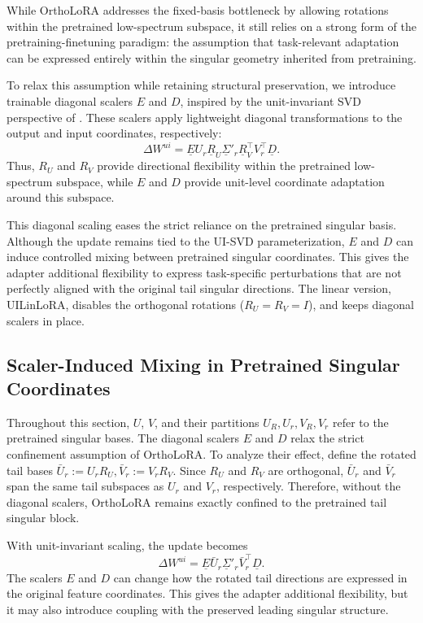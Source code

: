 \documentclass{article}
\begin{document}
While OrthoLoRA addresses the fixed-basis bottleneck by allowing rotations within
the pretrained low-spectrum subspace, it still relies on a strong form of the
pretraining-finetuning paradigm: the assumption that task-relevant adaptation
can be expressed entirely within the singular geometry inherited from
pretraining.

To relax this assumption while retaining structural preservation, we introduce
trainable diagonal scalers $E$ and $D$, inspired by the unit-invariant SVD
perspective of \citet{uhlmann2018generalized}. These scalers apply lightweight
diagonal transformations to the output and input coordinates, respectively:
\[
\Delta W^{ui}
=
\underline E U_r \underline R_U \underline \Sigma'_r \underline R_V^\top V_r^\top \underline D .
\]
Thus, $R_U$ and $R_V$ provide directional flexibility within the pretrained
low-spectrum subspace, while $E$ and $D$ provide unit-level coordinate
adaptation around this subspace.

This diagonal scaling eases the strict reliance on the pretrained singular basis. Although the update remains tied to the UI-SVD parameterization, $E$ and $D$ can induce controlled mixing between pretrained singular coordinates. This gives the adapter additional flexibility to express task-specific perturbations that are not perfectly aligned with the original tail singular directions. The linear version, UILinLoRA, disables the orthogonal rotations ($R_U = R_V = I$), and keeps diagonal scalers in place.

\subsection{Scaler-Induced Mixing in Pretrained Singular Coordinates}
Throughout this section, \(U\), \(V\), and their partitions \(U_R, U_r, V_R, V_r\) refer to the pretrained singular bases. The diagonal scalers $E$ and $D$ relax the strict confinement assumption of
OrthoLoRA. To analyze their effect, define the rotated tail bases $\bar{U}_r := U_r R_U, \bar{V}_r := V_r R_V .$
Since $R_U$ and $R_V$ are orthogonal, $\bar{U}_r$ and $\bar{V}_r$ span the same
tail subspaces as $U_r$ and $V_r$, respectively. Therefore, without the diagonal
scalers, OrthoLoRA remains exactly confined to the pretrained tail singular
block.

With unit-invariant scaling, the update becomes
\[
\Delta W^{ui}
=
\underline E \bar{U}_r \underline \Sigma'_r \bar{V}_r^\top  \underline D .
\]
The scalers $E$ and $D$ can change how the rotated tail directions are expressed
in the original feature coordinates. This gives the adapter additional
flexibility, but it may also introduce coupling with the preserved leading
singular structure.
\end{document}
